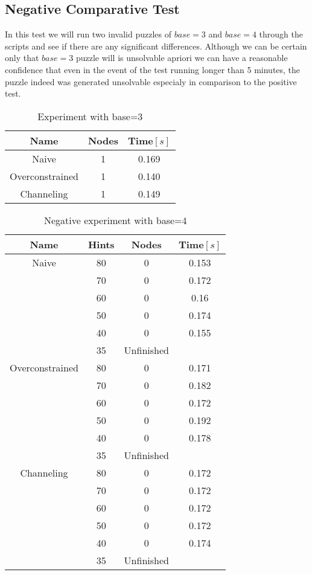 \documentclass[10pt,a4paper,oneside]{article}
\begin{document}
\subsection{Negative Comparative Test}
In this test we will run two invalid puzzles of $  base=3$ and $ base=4 $ through the scripts and see if there are any significant differences. Although we can be certain only that $  base=3$ puzzle will is unsolvable apriori we can have a reasonable confidence that even in the event of the test running longer than 5 minutes, the puzzle indeed was generated unsolvable especialy in comparison to the positive test.
\begin{table}[H] 
\begin{center}
\begin{tabular}{||c|| c c ||} 
  \hline
 Name & Nodes & Time$ \left[s\right] $ \\ [0.5ex] 
 \hline\hline
 Naive & 1 & 0.169  \\ 
 \hline
 Overconstrained & 1 & 0.140  \\
 \hline
 Channeling & 1 & 0.149  \\
 \hline

\end{tabular}
\end{center}
\caption{Experiment with base=3}
\end{table}

\begin{table}[H] 
\begin{center}
\begin{tabular}{||c|| c c c ||} 
 \hline
 Name & Hints & Nodes & Time$ \left[s\right] $ \\ [0.5ex] 
 \hline\hline
 Naive & 80 & 0 & 0.153  \\ 
 \hline
   	& 70 & 0 & 0.172 \\ 
 \hline
   	& 60 & 0 & 0.16 \\ 
 \hline
 	& 50 & 0 & 0.174 \\ 
 \hline
   	& 40 & 0 & 0.155 \\ 
 \hline
    & 35 & Unfinished & \\ 
 \hline
 Overconstrained & 80 & 0 & 0.171  \\
 \hline
    & 70 & 0 & 0.182 \\ 
 \hline
   & 60 & 0 & 0.172 \\ 
 \hline
 	& 50 & 0 & 0.192 \\ 
 \hline
   	& 40 & 0 & 0.178 \\ 
 \hline
    & 35 & Unfinished &\\ 
 \hline
 Channeling & 80 & 0 & 0.172  \\
 \hline
 	& 70 & 0 & 0.172  \\
 \hline
 	& 60 & 0 & 0.172  \\
 \hline
 	& 50 & 0 & 0.172  \\
 \hline
 	& 40 & 0 & 0.174  \\
 \hline
 	& 35 & Unfinished & \\
 \hline
\end{tabular}
\end{center}
\caption{Negative experiment with base=4}
\end{table}
\end{document}
